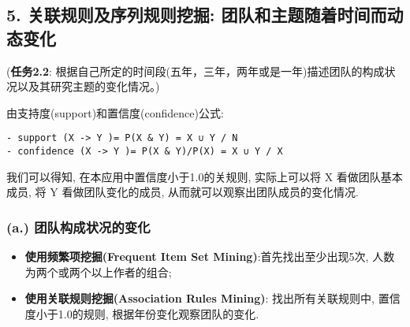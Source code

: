 \documentclass[11pt]{article}
\providecommand{\tightlist}{%
      \setlength{\itemsep}{0pt}\setlength{\parskip}{0pt}}
\begin{document}
    \subsection{5. 关联规则及序列规则挖掘:
团队和主题随着时间而动态变化}\label{ux5173ux8054ux89c4ux5219ux53caux5e8fux5217ux89c4ux5219ux6316ux6398-ux56e2ux961fux548cux4e3bux9898ux968fux7740ux65f6ux95f4ux800cux52a8ux6001ux53d8ux5316}

(\textbf{任务2.2}:
根据自己所定的时间段(五年，三年，两年或是一年)描述团队的构成状况以及其研究主题的变化情况。)

由支持度(support)和置信度(confidence)公式:

\begin{verbatim}
- support (X -> Y )= P(X & Y) = X ∪ Y / N
- confidence (X -> Y )= P(X & Y)/P(X) = X ∪ Y / X
\end{verbatim}

我们可以得知, 在本应用中置信度小于1.0的关规则, 实际上可以将 X
看做团队基本成员, 将 Y 看做团队变化的成员,
从而就可以观察出团队成员的变化情况.

\subsubsection{(a.)
团队构成状况的变化}\label{a.-ux56e2ux961fux6784ux6210ux72b6ux51b5ux7684ux53d8ux5316}

\begin{itemize}
\tightlist
\item
  \textbf{使用频繁项挖掘(Frequent Item Set Mining)}:首先找出至少出现5次,
  人数为两个或两个以上作者的组合;
\item
  \textbf{使用关联规则挖掘(Association Rules Mining)}:
  找出所有关联规则中, 置信度小于1.0的规则, 根据年份变化观察团队的变化.
\end{itemize}
\end{document}
